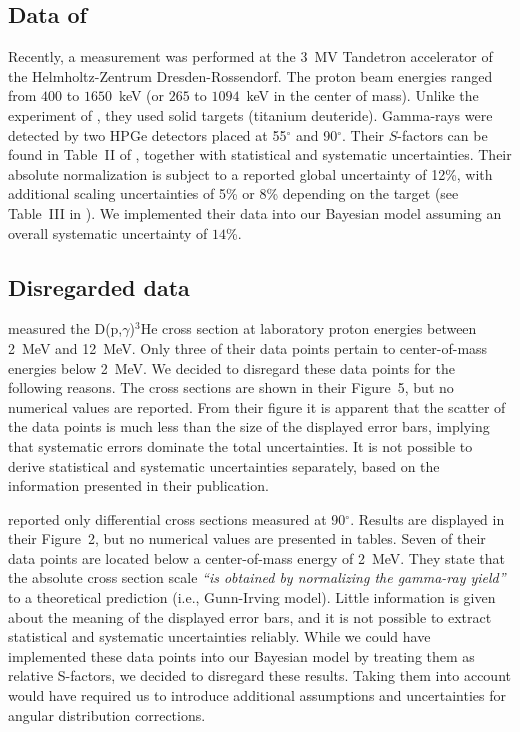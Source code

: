 \documentclass[twocolumn]{aastex63}
\begin{document}
\subsection{Data of \citet{Turkat21}}
\label{sec:Dresden}
Recently, a measurement \citep{Turkat21} was performed at the 3~MV Tandetron accelerator of the Helmholtz-Zentrum Dresden-Rossendorf. The proton beam energies ranged from $400$ to $1650$~keV (or $265$ to $1094$~keV in the center of mass). Unlike the experiment of \citet{Mossa20}, they used solid targets (titanium deuteride). Gamma-rays were detected by two HPGe detectors placed at 55$^{\circ}$ and 90$^{\circ}$. Their $S$-factors can be found in Table~II of \citet{Turkat21}, together with statistical and systematic uncertainties. Their absolute normalization is subject to a reported global uncertainty of 12\%, with additional scaling uncertainties of 5\% or 8\% depending on the target (see Table~III in \citet{Turkat21}). We implemented their data into our Bayesian model assuming an overall systematic uncertainty of $14$\%.

\subsection{Disregarded data}
\label{sec:ref_not}
\cite{Wol67} measured the D(p,$\gamma$)$^3$He cross section at laboratory proton energies between 2~MeV and 12~MeV. Only three of their data points pertain to center-of-mass energies below 2~MeV. We decided to disregard these data points for the following reasons. The cross sections are shown in their Figure~5, but no numerical values are reported. From their figure it is apparent that the scatter of the data points is much less than the size of the displayed error bars, implying that systematic errors dominate the total uncertainties. It is not possible to derive statistical and systematic uncertainties separately, based on the information presented in their publication.

\citet{Gel67} reported only differential cross sections measured at 90$^\circ$. Results are displayed in their Figure~2, but no numerical values are presented in tables. Seven of their data points are located below a center-of-mass energy of 2~MeV. They state that the absolute cross section scale {\it ``is obtained by normalizing the gamma-ray yield''} to a theoretical prediction (i.e., Gunn-Irving model). Little information is given about the meaning of the displayed error bars, and it is not possible to extract statistical and systematic uncertainties reliably. While we could have implemented these data points into our Bayesian model by treating them as relative S-factors, we decided to disregard these results. Taking them into account would have required us to introduce additional assumptions and uncertainties for angular distribution corrections. 
\end{document}

